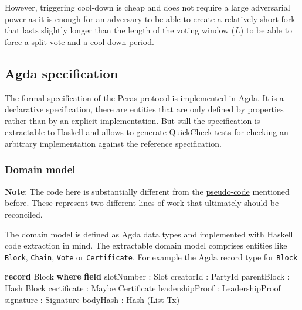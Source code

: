 \documentclass[10pt]{article}
\newenvironment{Shaded}{}{}
\newcommand{\KeywordTok}[1]{\textcolor[rgb]{0.00,0.44,0.13}{\textbf{#1}}}
\newcommand{\NormalTok}[1]{#1}
\newcommand{\OtherTok}[1]{\textcolor[rgb]{0.00,0.44,0.13}{#1}}
\begin{document}
However, triggering cool-down is cheap and does not require a large
adversarial power as it is enough for an adversary to be able to create
a relatively short fork that lasts slightly longer than the length of
the voting window (\(L\)) to be able to force a split vote and a
cool-down period.

\subsection{Agda specification}\label{agda-specification}

The formal specification of the Peras protocol is implemented in Agda.
It is a declarative specification, there are entities that are only
defined by properties rather than by an explicit implementation. But
still the specification is extractable to Haskell and allows to generate
QuickCheck tests for checking an arbitrary implementation against the
reference specification.

\subsubsection{Domain model}\label{domain-model}

\textbf{Note}: The code here is substantially different from the
\hyperref[pseudo-code]{pseudo-code} mentioned before. These represent
two different lines of work that ultimately should be reconciled.

The domain model is defined as Agda data types and implemented with
Haskell code extraction in mind. The extractable domain model comprises
entities like \texttt{Block}, \texttt{Chain}, \texttt{Vote} or
\texttt{Certificate}. For example the Agda record type for
\texttt{Block}

\begin{Shaded}
\begin{Highlighting}[]
\KeywordTok{record}\NormalTok{ Block }\KeywordTok{where}
  \KeywordTok{field}\NormalTok{ slotNumber }\OtherTok{:}\NormalTok{ Slot}
\NormalTok{        creatorId }\OtherTok{:}\NormalTok{ PartyId}
\NormalTok{        parentBlock }\OtherTok{:}\NormalTok{ Hash Block}
\NormalTok{        certificate }\OtherTok{:}\NormalTok{ Maybe Certificate}
\NormalTok{        leadershipProof }\OtherTok{:}\NormalTok{ LeadershipProof}
\NormalTok{        signature }\OtherTok{:}\NormalTok{ Signature}
\NormalTok{        bodyHash }\OtherTok{:}\NormalTok{ Hash }\OtherTok{(}\NormalTok{List Tx}\OtherTok{)}
\end{Highlighting}
\end{Shaded}
\end{document}
